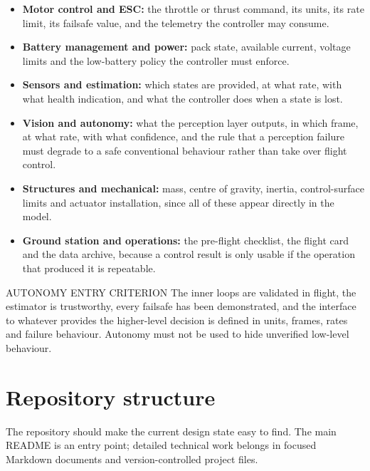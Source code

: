 \documentclass[11pt,a4paper]{article}
\begin{document}
\begin{itemize}
  \item \textbf{Motor control and ESC:} the throttle or thrust command, its units, its rate limit, its failsafe value, and the telemetry the controller may consume.
  \item \textbf{Battery management and power:} pack state, available current, voltage limits and the low-battery policy the controller must enforce.
  \item \textbf{Sensors and estimation:} which states are provided, at what rate, with what health indication, and what the controller does when a state is lost.
  \item \textbf{Vision and autonomy:} what the perception layer outputs, in which frame, at what rate, with what confidence, and the rule that a perception failure must degrade to a safe conventional behaviour rather than take over flight control.
  \item \textbf{Structures and mechanical:} mass, centre of gravity, inertia, control-surface limits and actuator installation, since all of these appear directly in the model.
  \item \textbf{Ground station and operations:} the pre-flight checklist, the flight card and the data archive, because a control result is only usable if the operation that produced it is repeatable.
\end{itemize}

\begin{callout}{AUTONOMY ENTRY CRITERION}
  The inner loops are validated in flight, the estimator is trustworthy, every
  failsafe has been demonstrated, and the interface to whatever provides the
  higher-level decision is defined in units, frames, rates and failure
  behaviour. Autonomy must not be used to hide unverified low-level behaviour.
\end{callout}

\section{Repository structure}

The repository should make the current design state easy to find. The main
README is an entry point; detailed technical work belongs in focused Markdown
documents and version-controlled project files.
\end{document}
